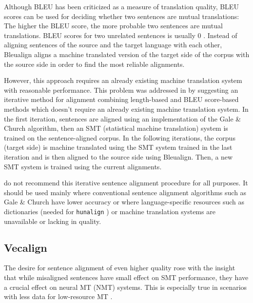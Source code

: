 Although BLEU has been criticized as a measure of translation quality, BLEU scores can be used for deciding whether two sentences are mutual translations:  
The higher the BLEU score, the more probable two sentences are mutual translations. 
BLEU scores for two unrelated sentences is usually 0 \autocite{sennrich-volk-2010-mt}. Instead of aligning sentences of the source and the target language with each other, Bleualign aligns a machine translated version of the target side of the corpus with the source side in order to find the most reliable alignments. 

However, this approach requires an already existing machine translation system with reasonable performance. 
This problem was addressed in \cite{sennrich-volk-2011-iterative} by suggesting an iterative method for alignment combining length-based and BLEU score-based methods which doesn't require an already existing machine translation system. 
In the first iteration, sentences are aligned using an implementation of the Gale \& Church algorithm, then an SMT (statistical machine translation) system is trained on the sentence-aligned corpus. 
In the following iterations, the corpus (target side) is machine translated using the SMT system trained in the last iteration and is then aligned to the source side using Bleualign. 
Then, a new SMT system is trained using the current alignments.

\cite{sennrich-volk-2011-iterative} do not recommend this iterative sentence alignment procedure for all purposes. 
It should be used mainly where conventional sentence alignment algorithms such as Gale \& Church have lower accuracy or where language-specific resources such as dictionaries (needed for \texttt{hunalign} \autocite{hunalign}) or machine translation systems are unavailable or lacking in quality.

\subsection{Vecalign}
The desire for  sentence alignment of even higher quality rose with the insight that while misaligned sentences have small effect on SMT performance, they have a crucial effect on neural MT (NMT) systems. 
This is especially true in scenarios with less data for low-resource MT \autocite{thompson-koehn-2019-vecalign}. 

